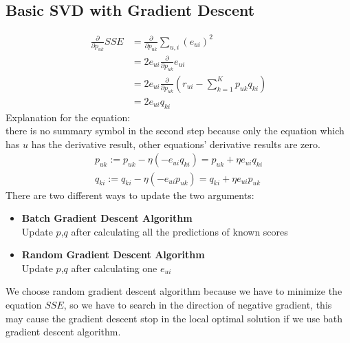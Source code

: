 \documentclass[]{article}
\begin{document}
\subsection{Basic SVD with Gradient Descent}
\begin{equation}
\begin{split}
   \frac{\partial }{\partial p_{uk}}SSE&=\frac{\partial}{\partial p_{uk}}\sum_{u,i}(e_{ui})^{2}\\
    &=2e_{ui}\frac{\partial}{\partial p_{uk}}e_{ui}\\
    &=2e_{ui}\frac{\partial}{\partial p_{uk}}(r_{ui}-\sum_{k=1}^{K}p_{uk}q_{ki})\\
    &=2e_{ui}q_{ki}
    \end{split}
\end{equation}
Explanation for the equation:\\
 there is no summary symbol in the second step because only the equation which has $u$ has the derivative result,  other equations' derivative results are zero.
 \begin{equation}
   \begin{split}
      p_{uk}:=p_{uk}-\eta(-e_{ui}q_{ki})=p_{uk}+\eta e_{ui}q_{ki}\\
      q_{ki}:=q_{ki}-\eta(-e_{ui}p_{uk})=q_{ki}+\eta e_{ui}p_{uk}
   \end{split}
 \end{equation}
There are two different ways to update the two arguments:
\begin{itemize}
	\item \textbf{Batch Gradient Descent Algorithm}\\
	      Update $p$,$q$ after calculating all the predictions of known scores
	\item \textbf{Random Gradient Descent Algorithm}\\
	      Update $p$,$q$ after calculating one $e_{ui}$	
\end{itemize}
We choose random gradient descent algorithm because we have to minimize the equation $SSE$,  so we have to search in the direction of negative gradient, this may cause the gradient descent stop in the local optimal solution if we use bath gradient descent algorithm. 
\end{document}
